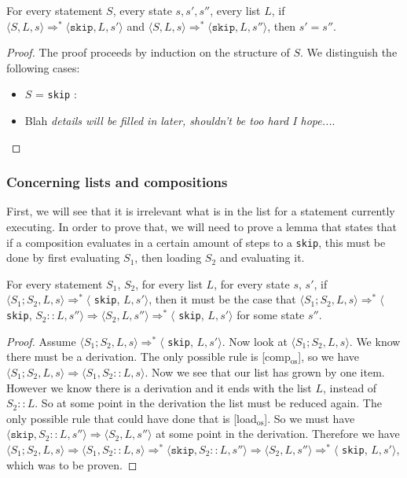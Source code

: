 \begin{theorem}
For every statement $S$, every state $s, s', s''$, every list $L$, if $\langle S, L, s \rangle \Rightarrow ^{*} \langle \texttt{skip}, L, s' \rangle$ and $\langle S, L, s \rangle \Rightarrow ^{*} \langle \texttt{skip}, L, s'' \rangle$, then $s' = s''$.
\end{theorem}

\begin{proof}
The proof proceeds by induction on the structure of $S$. We distinguish the following cases:
\begin{itemize}[noitemsep]
    \item $S$ = \texttt{skip} : 
    \item Blah \emph{details will be filled in later, shouldn't be too hard I hope...}.
\end{itemize}
\end{proof}

\subsubsection*{Concerning lists and compositions}
First, we will see that it is irrelevant what is in the list for a statement currently executing. In order to prove that, we will need to prove a lemma that states that if a composition evaluates in a certain amount of steps to a \texttt{skip}, this must be done by first evaluating $S_1$, then loading $S_2$ and evaluating it. 

\begin{lemma}
\label{breakingdowncomp}
For every statement $S_1$, $S_2$, for every list $L$, for every state $s$, $s'$, if $\langle S_1; S_2, L, s \rangle \Rightarrow ^{*} \langle$ \texttt{skip}, $L, s' \rangle$, then it must be the case that $\langle S_1;S_2, L, s \rangle \Rightarrow ^{*} \langle$ \texttt{skip}, $S_2::L, s'' \rangle \Rightarrow \langle S_2, L, s'' \rangle \Rightarrow ^{*} \langle$ \texttt{skip}, $L, s' \rangle$ for some state $s''$. 
\end{lemma}

\begin{proof}
Assume $\langle S_1; S_2, L, s \rangle \Rightarrow ^{*} \langle$ \texttt{skip}, $L, s' \rangle$. Now look at $\langle S_1; S_2, L, s \rangle$. We know there must be a derivation. The only possible rule is [comp$_{\textrm{os}}$], so we have $\langle S_1; S_2, L, s \rangle \Rightarrow \langle S_1, S_2::L, s \rangle$. Now we see that our list has grown by one item. However we know there is a derivation and it ends with the list $L$, instead of $S_2::L$. So at some point in the derivation the list must be reduced again. The only possible rule that could have done that is [load$_{\textrm{os}}$]. So we must have $\langle \texttt{skip} , S_2::L, s'' \rangle \Rightarrow \langle S_2, L, s'' \rangle$ at some point in the derivation. Therefore we have $\langle S_1; S_2, L, s \rangle \Rightarrow \langle S_1, S_2::L, s \rangle \Rightarrow ^{*} \langle \texttt{skip} , S_2::L, s'' \rangle \Rightarrow \langle S_2, L, s'' \rangle \Rightarrow ^{*} \langle$ \texttt{skip}, $L, s' \rangle$, which was to be proven.
\end{proof}

